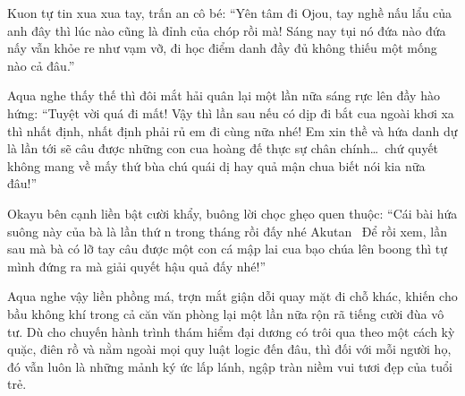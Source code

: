 \documentclass[../main.tex]{subfiles}
\begin{document}
Kuon tự tin xua xua tay, trấn an cô bé: ``Yên tâm đi Ojou, tay nghề nấu lẩu của anh đây thì lúc nào cũng là đỉnh của chóp rồi mà!  Sáng nay tụi nó đứa nào đứa nấy vẫn khỏe re như vạm vỡ, đi học điểm danh đầy đủ không thiếu một mống nào cả đâu.''

Aqua nghe thấy thế thì đôi mắt hải quân lại một lần nữa sáng rực lên đầy hào hứng: ``Tuyệt vời quá đi mất! Vậy thì lần sau nếu có dịp đi bắt cua ngoài khơi xa thì nhất định, nhất định phải rủ em đi cùng nữa nhé!  Em xin thề và hứa danh dự là lần tới sẽ câu được những con cua hoàng đế thực sự chân chính\dots\ chứ quyết không mang về mấy thứ bùa chú quái dị hay quả mận chua biết nói kia nữa đâu!''

Okayu bên cạnh liền bật cười khẩy, buông lời chọc ghẹo quen thuộc: ``Cái bài hứa suông này của bà là lần thứ n trong tháng rồi đấy nhé Akutan~  Để rồi xem, lần sau mà bà có lỡ tay câu được một con cá mập lai cua bạo chúa lên boong thì tự mình đứng ra mà giải quyết hậu quả đấy nhé!''

Aqua nghe vậy liền phồng má, trợn mắt giận dỗi quay mặt đi chỗ khác, khiến cho bầu không khí trong cả căn văn phòng lại một lần nữa rộn rã tiếng cười đùa vô tư. Dù cho chuyến hành trình thám hiểm đại dương có trôi qua theo một cách kỳ quặc, điên rồ và nằm ngoài mọi quy luật logic đến đâu, thì đối với mỗi người họ, đó vẫn luôn là những mảnh ký ức lấp lánh, ngập tràn niềm vui tươi đẹp của tuổi trẻ.
\end{document}
